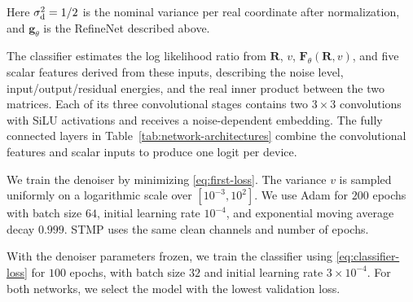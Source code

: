 Here $\sigma_{\rm d}^2=1/2$ is the nominal variance per real coordinate after
normalization, and $\mathbf g_\theta$ is the RefineNet described above.

The classifier estimates the log likelihood ratio from $\mathbf R$, $v$,
$\mathbf F_\theta(\mathbf R,v)$, and five scalar features derived from these
inputs, describing the noise level, input/output/residual energies, and the
real inner product between the two matrices. Each of its three convolutional stages contains two
$3\times3$ convolutions with SiLU activations and receives a
noise-dependent embedding. The fully connected layers in
Table~\ref{tab:network-architectures} combine the convolutional features
and scalar inputs to produce one logit per device.

We train the denoiser by minimizing \eqref{eq:first-loss}. The variance $v$
is sampled uniformly on a logarithmic scale over $[10^{-3},10^2]$.
We use Adam for $200$ epochs with batch size $64$, initial learning
rate $10^{-4}$, and exponential moving average decay $0.999$.
STMP uses the same clean channels and number of epochs.

With the denoiser parameters frozen, we train the classifier using
\eqref{eq:classifier-loss} for $100$ epochs, with batch size $32$
and initial learning rate $3\times10^{-4}$. For both networks, we select
the model with the lowest validation loss.

